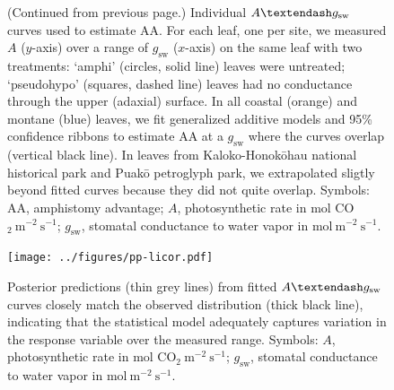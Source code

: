 \documentclass[
  letterpaper,
  DIV=11,
  numbers=noendperiod]{scrartcl}
\begin{document}
\newpage

\setcounter{figure}{\numexpr\value{figure}-1\relax}

\begin{figure}
  \caption{(Continued from previous page.) Individual $A \textendash g_\mathrm{sw}$ curves used to estimate $\mathrm{AA}$. For each leaf, one per site, we measured $A$ ($y$-axis) over a range of $g_\mathrm{sw}$ ($x$-axis) on the same leaf with two treatments: `amphi' (circles, solid line) leaves were untreated; `pseudohypo' (squares, dashed line) leaves had no conductance through the upper (adaxial) surface. In all coastal (orange) and montane (blue) leaves, we fit generalized additive models and 95\% confidence ribbons to estimate $\mathrm{AA}$ at a $g_\mathrm{sw}$ where the curves overlap (vertical black line). In leaves from Kaloko-Honokōhau national historical park and Puakō petroglyph park, we extrapolated sligtly beyond fitted curves because they did not quite overlap. Symbols: $\mathrm{AA}$, amphistomy advantage; $A$, photosynthetic rate in \textmu mol CO$_2~\text{m}^{-2}~\text{s}^{-1}$; $g_\mathrm{sw}$, stomatal conductance to water vapor in $\text{mol}~\text{m}^{-2}~\text{s}^{-1}$.}
  \label{fig:licor}
\end{figure}

\newpage

\begin{figure}
  \texttt{[image: ../figures/pp-licor.pdf]}
  \caption{Posterior predictions (thin grey lines) from fitted $A \textendash g_\mathrm{sw}$ curves closely match the observed distribution (thick black line), indicating that the statistical model adequately captures variation in the response variable over the measured range. Symbols: $A$, photosynthetic rate in \textmu mol CO$_2~\text{m}^{-2}~\text{s}^{-1}$; $g_\mathrm{sw}$, stomatal conductance to water vapor in $\text{mol}~\text{m}^{-2}~\text{s}^{-1}$.}
  \label{fig:pp-licor}
\end{figure}

\newpage
\end{document}
